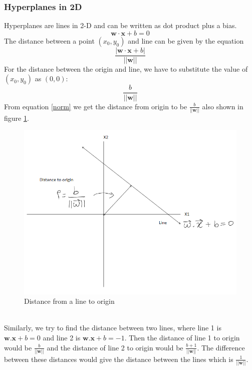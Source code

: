 \documentclass[11pt]{article}
\begin{document}
\subsubsection{Hyperplanes in 2D}
Hyperplanes are lines in 2-D and can be written as dot product plus a bias. 
\begin{equation}\label{hp1}
    \mathbf{w}\cdot \mathbf{x}+b=0
\end{equation}
The distance between a point $(x_0,y_0)$ and line can be given by the equation 
\begin{equation}\label{hp2}
    \frac{|\mathbf{w}\cdot \mathbf{x}+b|}{||\mathbf{w}||}
\end{equation}
For the distance between the origin and line, we have to substitute the value of $(x_0,y_0)$ as $(0,0)$:
\begin{equation}\label{norm}
     \frac{b}{||\mathbf{w}||}
\end{equation}  From equation \ref{norm} we get the distance from origin to be $\frac{b}{||\mathbf{w}||}$ also shown in figure \ref{fig:fig2}.
\begin{figure}[h!]
    \centering
  \includegraphics[scale=0.7]{fig2.PNG}
  \caption{Distance from a line to origin}
  \label{fig:fig2}
\end{figure}
\\Similarly, we try to find the distance between two lines, where line 1 is $\mathbf{w}.\mathbf{x}+b=0$ and line 2 is $\mathbf{w}.\mathbf{x}+b=-1$. Then the distance of line 1 to origin would be $\frac{b}{||\mathbf{w}||}$ and the distance of line 2 to origin would be $\frac{b+1}{||\mathbf{w}||}$. The difference between these distances would give the distance between the lines which is $\frac{1}{||\mathbf{w}||}$.
\end{document}
